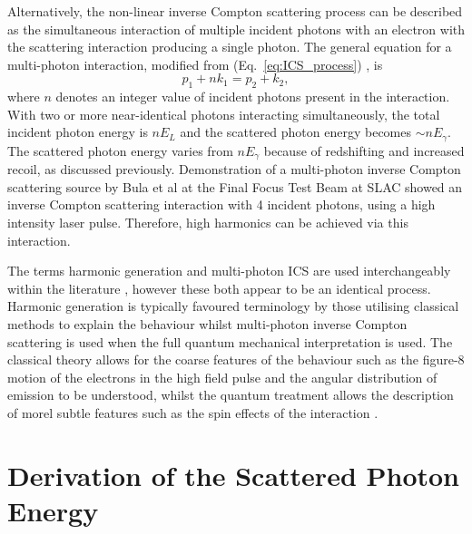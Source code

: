 \documentclass[../main.tex]{subfiles}
\begin{document}
Alternatively, the non-linear inverse Compton scattering process can be described as the simultaneous interaction of multiple incident photons with an electron with the scattering interaction producing a single photon. The general equation for a multi-photon interaction, modified from (Eq.~\ref{eq:ICS_process}) \cite{bula1996observation,seipt2011nonlinear}, is
\begin{equation}
p_{1} + \mathit{n}k_{1} = p_{2} + k_{2},
\label{eq:nonlinear_electron_photon_interaction}    
\end{equation}
where $\mathit{n}$ denotes an integer value of incident photons present in the interaction. With two or more near-identical photons interacting simultaneously, the total incident photon energy is $n E_{L}$ and the scattered photon energy becomes $\sim \mathit{n}E_{\gamma}$. The scattered photon energy varies from $\mathit{n}E_{\gamma}$ because of redshifting and increased recoil, as discussed previously. Demonstration of a multi-photon inverse Compton scattering source by Bula et al \cite{bula1996observation} at the Final Focus Test Beam at SLAC \cite{burke1994results} showed an inverse Compton scattering interaction with 4 incident photons, using a high intensity laser pulse. Therefore, high harmonics can be achieved via this interaction. 

The terms harmonic generation and multi-photon ICS are used interchangeably within the literature \cite{englert1983second}, however these both appear to be an identical process. Harmonic generation is typically favoured terminology by those utilising classical methods to explain the behaviour whilst multi-photon inverse Compton scattering is used when the full quantum mechanical interpretation is used. The classical theory \cite{sarachik1970classical} allows for the coarse features of the behaviour such as the figure-8 motion of the electrons in the high field pulse and the angular distribution of emission to be understood, whilst the quantum treatment \cite{brown1964interaction,kibble1965frequency} allows the description of morel subtle features such as the spin effects of the interaction \cite{seipt2011nonlinear}.    

\section{Derivation of the Scattered Photon Energy}
\label{sec:derivation_of_the_scattered_photon_energy}
\end{document}
